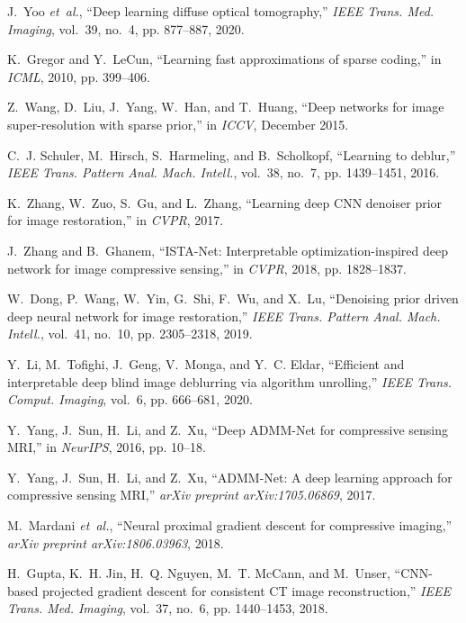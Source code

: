 \documentclass[journal,twoside]{IEEEtran}
\begin{document}
\begin{thebibliography}{10}
J.~Yoo \emph{et~al.}, ``Deep learning diffuse optical tomography,'' \emph{IEEE
  Trans. Med. Imaging}, vol.~39, no.~4, pp. 877--887, 2020.

K.~Gregor and Y.~LeCun, ``Learning fast approximations of sparse coding,'' in
  \emph{ICML}, 2010, pp. 399--406.

Z.~Wang, D.~Liu, J.~Yang, W.~Han, and T.~Huang, ``Deep networks for image
  super-resolution with sparse prior,'' in \emph{ICCV}, December 2015.

C.~J. Schuler, M.~Hirsch, S.~Harmeling, and B.~Scholkopf, ``Learning to
  deblur,'' \emph{IEEE Trans. Pattern Anal. Mach. Intell.}, vol.~38, no.~7, pp.
  1439--1451, 2016.

K.~Zhang, W.~Zuo, S.~Gu, and L.~Zhang, ``Learning deep {CNN} denoiser prior for
  image restoration,'' in \emph{CVPR}, 2017.

J.~Zhang and B.~Ghanem, ``{ISTA-Net}: Interpretable optimization-inspired deep
  network for image compressive sensing,'' in \emph{CVPR}, 2018, pp.
  1828--1837.

W.~Dong, P.~Wang, W.~Yin, G.~Shi, F.~Wu, and X.~Lu, ``Denoising prior driven
  deep neural network for image restoration,'' \emph{IEEE Trans. Pattern Anal.
  Mach. Intell.}, vol.~41, no.~10, pp. 2305--2318, 2019.

Y.~Li, M.~Tofighi, J.~Geng, V.~Monga, and Y.~C. Eldar, ``Efficient and
  interpretable deep blind image deblurring via algorithm unrolling,''
  \emph{IEEE Trans. Comput. Imaging}, vol.~6, pp. 666--681, 2020.

Y.~Yang, J.~Sun, H.~Li, and Z.~Xu, ``{Deep ADMM-Net} for compressive sensing
  {MRI},'' in \emph{NeurIPS}, 2016, pp. 10--18.

Y.~Yang, J.~Sun, H.~Li, and Z.~Xu, ``{ADMM-Net}: A deep learning approach for
  compressive sensing {MRI},'' \emph{arXiv preprint arXiv:1705.06869}, 2017.

M.~Mardani \emph{et~al.}, ``Neural proximal gradient descent for compressive
  imaging,'' \emph{arXiv preprint arXiv:1806.03963}, 2018.

H.~Gupta, K.~H. Jin, H.~Q. Nguyen, M.~T. McCann, and M.~Unser, ``{CNN}-based
  projected gradient descent for consistent {CT} image reconstruction,''
  \emph{IEEE Trans. Med. Imaging}, vol.~37, no.~6, pp. 1440--1453, 2018.


\end{thebibliography}
\end{document}
